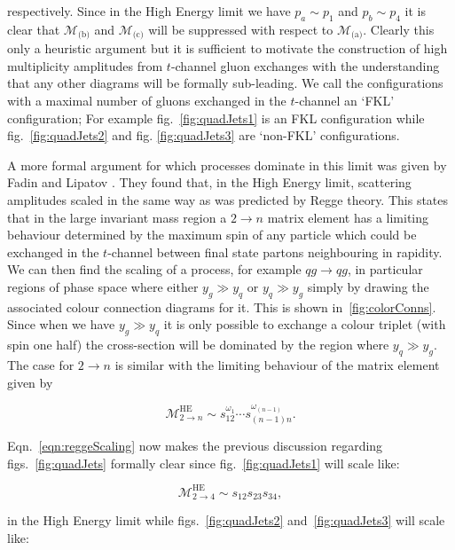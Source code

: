 	respectively.  Since in the High
	Energy limit we have $p_a\sim p_1$ and $p_b\sim p_4$ it is clear that $\mathcal{M}_{\text{(b)}}$
	and $\mathcal{M}_{\text{(c)}}$ will be suppressed with respect to $\mathcal{M}_{\text{(a)}}$.
	Clearly this only a heuristic argument but it is sufficient to motivate the construction of
	high multiplicity amplitudes from $t$-channel gluon exchanges with the understanding that any
	other diagrams will be formally sub-leading.  We call the configurations with a maximal
	number of gluons exchanged in the $t$-channel an `FKL' configuration;  For example
	fig.~\eqref{fig:quadJets1} is an FKL configuration while fig.~\eqref{fig:quadJets2} and fig.
	\eqref{fig:quadJets3} are `non-FKL' configurations.

	A more formal argument for which processes dominate in this limit was given by Fadin and Lipatov
	\cite{Kuraev:1976ge,Balitsky:1978ic}.  They found that, in the High Energy limit, scattering
	amplitudes scaled in the same way as was predicted by Regge theory.  This states that in the
	large invariant mass region a $2\to n$ matrix element has a limiting behaviour determined by
	the maximum spin of any particle which could be exchanged in the $t$-channel between final
	state partons neighbouring in rapidity.  We can then find the scaling of a process, for example
	$qg\to qg$, in particular regions of phase space where either $y_g\gg y_q$ or $y_q\gg y_g$ simply
	by drawing the associated colour connection diagrams for it.  This is shown in~\eqref{fig:colorConns}.
	Since when we have $y_g\gg y_q$ it is only possible to exchange a colour triplet (with spin one half)
	the cross-section will be dominated by the region where $y_q\gg y_g$.  The case for $2\to n$ is similar
	with the limiting behaviour of the matrix element given by

	\begin{equation}
		\mathcal{M}^{\text{HE}}_{2\to n}\sim s_{12}^{\omega_1}\cdots s_{(n-1)n}^{\omega_{(n-1)}}.
		\label{eqn:reggeScaling}
	\end{equation}

	Eqn.~\eqref{eqn:reggeScaling} now makes the previous discussion regarding figs.~\eqref{fig:quadJets}
	formally clear since fig.~\eqref{fig:quadJets1} will scale like:

	\begin{equation}
		\mathcal{M}^{\text{HE}}_{2\to 4} \sim s_{12}s_{23}s_{34},
	\end{equation}

	in the High Energy limit while figs.~\eqref{fig:quadJets2} and~\eqref{fig:quadJets3} will scale
	like:

